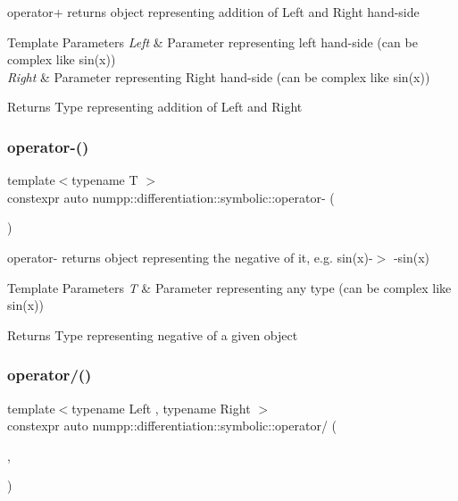 operator+ returns object representing addition of Left and Right hand-\/side 
\begin{DoxyTemplParams}{Template Parameters}
{\em Left} & Parameter representing left hand-\/side (can be complex like sin(x)) \\
\hline
{\em Right} & Parameter representing Right hand-\/side (can be complex like sin(x))\\
\hline
\end{DoxyTemplParams}
\begin{DoxyReturn}{Returns}
Type representing addition of Left and Right
\end{DoxyReturn}
\mbox{\label{group__numpp__differentiation__symbolic_ga4aecf7125ae67f3c834ed8ab5e14248a}} 
\subsubsection{\texorpdfstring{operator-\/()}{operator-()}}
{\footnotesize\ttfamily template$<$typename T $>$ \\
constexpr auto numpp\+::differentiation\+::symbolic\+::operator-\/ (\begin{DoxyParamCaption}\item[{const T \&}]{ }\end{DoxyParamCaption})}

operator-\/ returns object representing the negative of it, e.\+g. sin(x)-\/$>$ -\/sin(x) 
\begin{DoxyTemplParams}{Template Parameters}
{\em T} & Parameter representing any type (can be complex like sin(x))\\
\hline
\end{DoxyTemplParams}
\begin{DoxyReturn}{Returns}
Type representing negative of a given object
\end{DoxyReturn}
\mbox{\label{group__numpp__differentiation__symbolic_gac882bc2dcbffae1107c46bc3eac93a44}} 
\subsubsection{\texorpdfstring{operator/()}{operator/()}}
{\footnotesize\ttfamily template$<$typename Left , typename Right $>$ \\
constexpr auto numpp\+::differentiation\+::symbolic\+::operator/ (\begin{DoxyParamCaption}\item[{const Left \&}]{,  }\item[{const Right \&}]{ }\end{DoxyParamCaption})}

